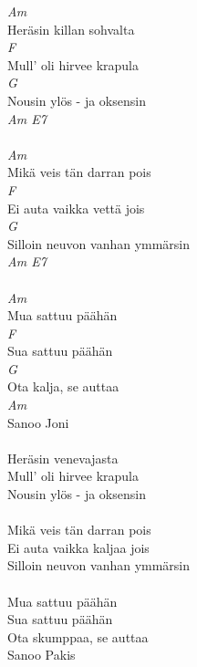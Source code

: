 
\textit{Am} \\ 
Heräsin killan sohvalta \\
\textit{F} \\ 
Mull' oli hirvee krapula \\
\textit{G} \\ 
Nousin ylös - ja oksensin \\
\textit{Am E7} \\ 
\hspace{10mm} \\
\textit{Am} \\ 
Mikä veis tän darran pois \\
\textit{F} \\ 
Ei auta vaikka vettä jois \\
\textit{G} \\ 
Silloin neuvon vanhan ymmärsin \\
\textit{Am E7} \\ 
\hspace{10mm} \\
\textit{Am} \\ 
Mua sattuu päähän \\
\textit{F} \\ 
Sua sattuu päähän \\
\textit{G} \\ 
Ota kalja, se auttaa \\
\textit{Am} \\ 
Sanoo Joni \\
\hspace{10mm} \\
Heräsin venevajasta \\
Mull' oli hirvee krapula \\
Nousin ylös - ja oksensin \\
\hspace{10mm} \\
Mikä veis tän darran pois \\
Ei auta vaikka kaljaa jois \\
Silloin neuvon vanhan ymmärsin \\
\hspace{10mm} \\
Mua sattuu päähän \\
Sua sattuu päähän \\
Ota skumppaa, se auttaa \\
Sanoo Pakis \\
\hspace{10mm} \\

